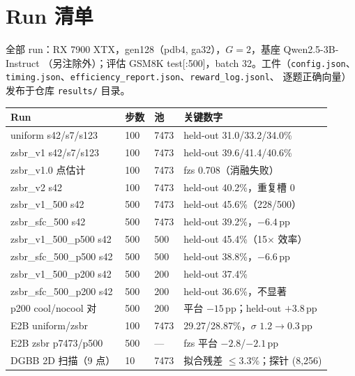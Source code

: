 \documentclass[11pt]{article}
\theoremstyle{definition}
\begin{document}
\section{Run 清单}\label{app:runs}
全部 run：RX 7900 XTX，gen128（pdb4, ga32），$G{=}2$，基座 Qwen2.5-3B-Instruct
（另注除外）；评估 GSM8K test[:500]，batch 32。工件（\texttt{config.json}、
\texttt{timing.json}、\texttt{efficiency\_report.json}、\texttt{reward\_log.jsonl}、
逐题正确向量）发布于仓库 \texttt{results/} 目录。
\begin{center}\small
\begin{tabular}{@{}llll@{}}
\toprule
Run & 步数 & 池 & 关键数字 \\
\midrule
uniform s42/s7/s123 & 100 & 7473 & held-out 31.0/33.2/34.0\% \\
zsbr\_v1 s42/s7/s123 & 100 & 7473 & held-out 39.6/41.4/40.6\% \\
zsbr\_v1.0 点估计 & 100 & 7473 & fzs 0.708（消融失败） \\
zsbr\_v2 s42 & 100 & 7473 & held-out 40.2\%，重复槽 0 \\
zsbr\_v1\_500 s42 & 500 & 7473 & held-out 45.6\%（228/500） \\
zsbr\_sfc\_500 s42 & 500 & 7473 & held-out 39.2\%，$-6.4$\,pp \\
zsbr\_v1\_500\_p500 s42 & 500 & 500 & held-out 45.4\%（15$\times$ 效率） \\
zsbr\_sfc\_500\_p500 s42 & 500 & 500 & held-out 38.8\%，$-6.6$\,pp \\
zsbr\_v1\_500\_p200 s42 & 500 & 200 & held-out 37.4\% \\
zsbr\_sfc\_500\_p200 s42 & 500 & 200 & held-out 36.6\%，不显著 \\
p200 cool/nocool 对 & 500 & 200 & 平台 $-15$\,pp；held-out $+3.8$\,pp \\
E2B uniform/zsbr & 100 & 7473 & 29.27/28.87\%，$\sigma$ $1.2{\to}0.3$\,pp \\
E2B zsbr p7473/p500 & 500 & --- & fzs 平台 $-2.8$/$-2.1$\,pp \\
DGBB 2D 扫描（9 点） & 10 & 7473 & 拟合残差 $\le$3.3\%；探针 (8,256) \\
\bottomrule
\end{tabular}
\end{center}
\end{document}
